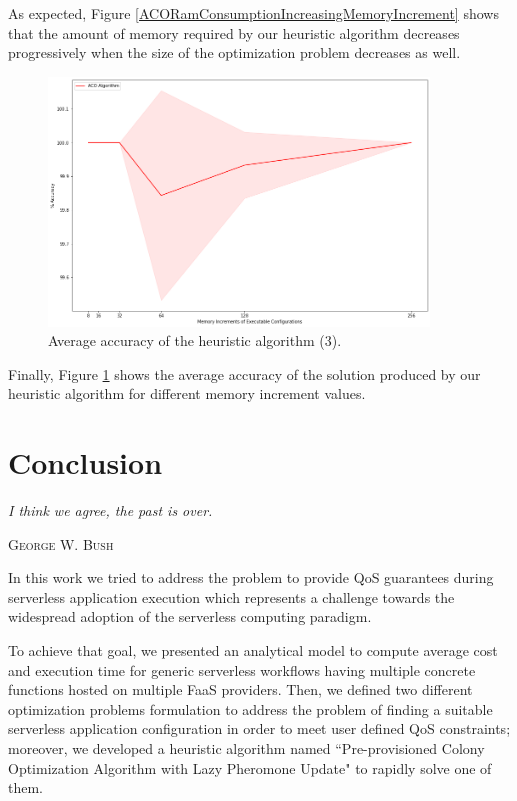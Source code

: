 \documentclass[12pt,a4paper]{report}
\newcommand{\QuoteIntro}{``}
\begin{document}
As expected, Figure \ref{ACORamConsumptionIncreasingMemoryIncrement} shows that the amount of memory required by our heuristic algorithm decreases progressively when the size of the optimization problem decreases as well.

\begin{figure}[h]
	\centering
	\includegraphics[width=0.9\textwidth]{./Images/ACOvsOptimalAccuracyIncreasingMemoryIncrement.png}
	\caption{Average accuracy of the heuristic algorithm (3).}%
	\label{ACOvsOptimalAccuracyIncreasingMemoryIncrement}
\end{figure}

Finally, Figure \ref{ACOvsOptimalAccuracyIncreasingMemoryIncrement} shows the average accuracy of the solution produced by our heuristic algorithm for different memory increment values.

\chapter{Conclusion}\label{chapterConclusion}
\epigraph{\itshape I think we agree, the past is over.}{\textsc{George W. Bush}}

In this work we tried to address the problem to provide QoS guarantees during serverless application execution which represents a challenge towards the widespread adoption of the serverless computing paradigm.

To achieve that goal, we presented an analytical model to compute average cost and execution time for generic serverless workflows having multiple concrete functions hosted on multiple FaaS providers. Then, we defined two different optimization problems formulation to address the problem of finding a suitable serverless application configuration in order to meet user defined QoS constraints; moreover, we developed a heuristic algorithm named \QuoteIntro Pre-provisioned Colony Optimization Algorithm with Lazy Pheromone Update" to rapidly solve one of them. 
\end{document}
